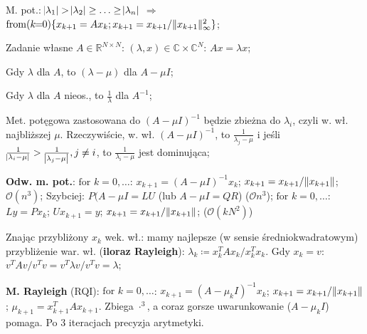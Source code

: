 
\entry
M. pot.:
$\abs{\lambda_1}>\abs{\lambda_2}\geq\ldots\geq\abs{\lambda_n}$
$\Rightarrow$
$\fromloop{k}\{x_{k+1}=Ax_k; \normify[\infty][2]{x_{k+1}}\}$;

\entry
Zadanie własne $A \in \mathbb{R}^{N \times N}$:
$(\lambda,x) \in \mathbb{C} \times \mathbb{C}^N$:
$Ax = \lambda x$;

\entry
Gdy $\lambda$ dla $A$, to $(\lambda - \mu)$ dla $A-\mu I$;

\entry
Gdy $\lambda$ dla $A$ nieos., to $\frac{1}{\lambda}$ dla $A^{-1}$;

\entry
Met. potęgowa zastosowana do
$(A-\mu I)^{-1}$
będzie zbieżna do
$\lambda_i$,
czyli w. wł. najbliższej $\mu$.
Rzeczywiście, w. wł.
$(A-\mu I)^{-1}$,
to
$\frac{1}{\lambda_j-\mu}$
i jeśli
$\frac{1}{\abs{\lambda_i-\mu}} > \frac{1}{\abs{\lambda_j-\mu}}, j\neq i$,
to
$\frac{1}{\lambda_i-\mu}$
jest dominująca;


\entry
\textbf{Odw. m. pot.}:
$\text{for } k=0,\ldots$:
$x_{k+1} = (A-\mu I)^{-1}x_k$;
$x_{k+1} = x_{k+1} / \|x_{k+1}\|$;
$\mathcal{O}(n^3)$;
\entry
Szybciej:
$P(A- \mu I = LU$ (lub $A-\mu I = QR$) ($\mathcal{O}{n^3}$);
$\text{for } k=0,\ldots$:
$Ly=Px_k$;
$Ux_{k+1} = y$;
$x_{k+1} = x_{k+1} / \|x_{k+1}\|$;
($\mathcal{O}(kN^2)$)

\entry
Znając przybliżony $x_k$ wek. wł.: mamy najlepsze (w sensie
średniokwadratowym) przybliżenie war. wł. (\textbf{iloraz Rayleigh}):
$\lambda_k \coloneqq x_k^T A x_k / x_k^T x_k$.
Gdy $x_k = v$:
$v^T A v / v^T v = v^T \lambda v / v^T v = \lambda$;

\entry
\textbf{M. Rayleigh} (RQI):
$\text{for } k=0,\ldots$:
$x_{k+1} = (A - \mu_k I)^{-1} x_k$;
$x_{k+1} = x_{k+1} / \|x_{k+1}\|$;
$\mu_{k+1} = x_{k+1}^T A x_{k+1}$.
Zbiega $\cdot^3$, a coraz gorsze uwarunkowanie ($A-\mu_k I$) pomaga.
Po $3$ iteracjach precyzja arytmetyki.


